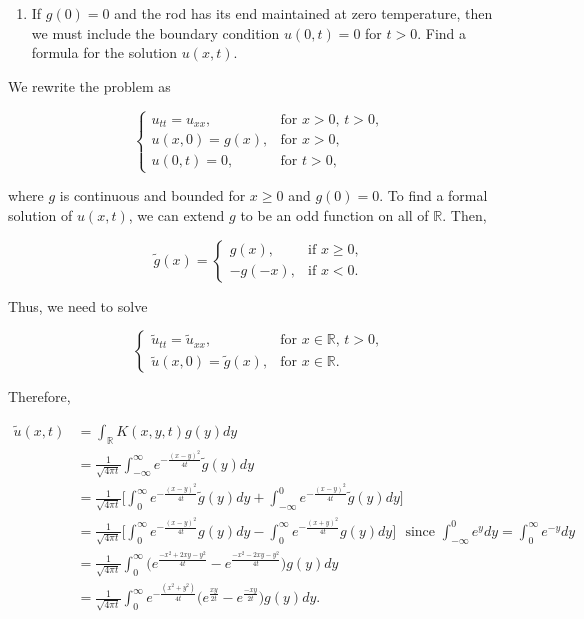 \documentclass{article}
\begin{document}
\begin{enumerate}[label=(\alph*)]
    \item If $g(0)=0$ and the rod has its end maintained at zero temperature, then we must include the boundary condition $u(0,t)=0$ for $t>0$. Find a formula for the solution $u(x,t)$.
\end{enumerate}

We rewrite the problem as

\[
  \begin{cases}
  u_{tt}=u_{xx},  &\text{for $x>0$, $t>0$}, \\
  u(x,0)=g(x),& \text{for $x>0$},\\
  u(0,t)=0, &\text{for $t>0$},
  \end{cases}
\]

where $g$ is continuous and bounded for $x\geq 0$ and $g(0)=0$. To find a formal solution of $u(x,t)$, we can extend $g$ to be an odd function on all of $\mathbb R$. Then,

\[
  \tilde{g}(x) =
  \begin{cases}
    g(x), & \text{if $x\geq 0$}, \\
    -g(-x), & \text{if $x < 0$}.
  \end{cases}
\]

Thus, we need to solve

\[
  \begin{cases}
  \tilde{u}_{tt}=\tilde{u}_{xx},  &\text{for $x\in\mathbb R$, $t>0$}, \\
  \tilde{u}(x,0)=\tilde{g}(x),& \text{for $x\in\mathbb R$}.
  \end{cases}
\]

Therefore,

\begin{equation*}
\begin{split}
\tilde{u}(x,t) &= \int_{\mathbb R}K(x,y,t)g(y)dy \\&=\frac{1}{\sqrt{4\pi t}}\int_{-\infty}^{\infty} e^{-\frac{(x-y)^2}{4t}}\tilde{g}(y)dy \\ &=
\frac{1}{\sqrt{4\pi t}}\Bigg[\int_{0}^{\infty} e^{-\frac{(x-y)^2}{4t}}\tilde{g}(y)dy +
\int_{-\infty}^{0} e^{-\frac{(x-y)^2}{4t}}\tilde{g}(y)dy\Bigg]\\ &=
\frac{1}{\sqrt{4\pi t}}\Bigg[\int_{0}^{\infty} e^{-\frac{(x-y)^2}{4t}}g(y)dy -
\int_{0}^{\infty} e^{-\frac{(x+y)^2}{4t}}g(y)dy\Bigg]~~~\text{since $\int_{-\infty}^{0}e^ydy=\int_{0}^{\infty}e^{-y}dy$}\\&=
\frac{1}{\sqrt{4\pi t}}\int_{0}^{\infty}\Bigg( e^{\frac{-x^2+2xy-y^2}{4t}} - e^{\frac{-x^2-2xy-y^2}{4t}}\Bigg)g(y)dy \\&=
\frac{1}{\sqrt{4\pi t}}\int_{0}^{\infty}e^{-\frac{(x^2+y^2)}{4t}}\Big(e^{\frac{xy}{2t}}-e^{\frac{-xy}{2t}}\Big)g(y)dy.
\end{split}
\end{equation*}
\end{document}
